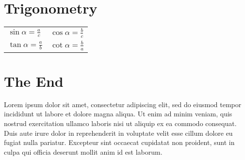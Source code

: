 \documentclass[letter,9pt]{extarticle}
\begin{document}
\begin{multicols*}{2}
\section{Trigonometry}


\medskip

\begin{tabular}{ll}
$\sin\alpha = \frac{a}{c}$ & $\cos\alpha = \frac{b}{c}$ \\[1ex]
$\tan\alpha = \frac{a}{b}$ & $\cot\alpha = \frac{b}{a}$ \\
\end{tabular}


\section{The End}

Lorem ipsum dolor sit amet, consectetur adipiscing elit, sed do eiusmod tempor incididunt ut labore et dolore magna aliqua. Ut enim ad minim veniam, quis nostrud exercitation ullamco laboris nisi ut aliquip ex ea commodo consequat. Duis aute irure dolor in reprehenderit in voluptate velit esse cillum dolore eu fugiat nulla pariatur. Excepteur sint occaecat cupidatat non proident, sunt in culpa qui officia deserunt mollit anim id est laborum.


\end{multicols*}
\end{document}
